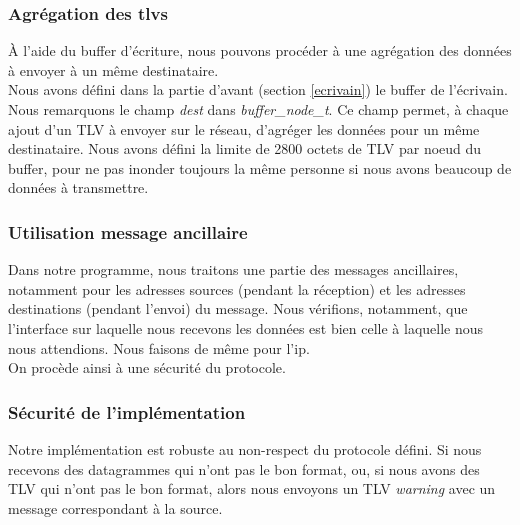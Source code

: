 \documentclass{FR16}
\begin{document}
\subsubsection{Agrégation des tlvs}
À l'aide du buffer d'écriture, nous pouvons procéder à une agrégation des données à envoyer à un même destinataire.\\
Nous avons défini dans la partie d'avant (section \ref{ecrivain}) le buffer de l'écrivain. Nous remarquons le champ \textit{dest} dans \textit{buffer\_node\_t}. Ce champ permet, à chaque ajout d'un TLV à envoyer sur le réseau, d'agréger les données pour un même destinataire. Nous avons défini la limite de 2800 octets de TLV par noeud du buffer, pour ne pas inonder toujours la même personne si nous avons beaucoup de données à transmettre.
\subsubsection{Utilisation message ancillaire}
Dans notre programme, nous traitons une partie des messages ancillaires, notamment pour les adresses sources (pendant la réception) et les adresses destinations (pendant l'envoi) du message. Nous vérifions, notamment, que l'interface sur laquelle nous recevons les données est bien celle à laquelle nous nous attendions. Nous faisons de même pour l'ip.\\
On procède ainsi à une sécurité du protocole.
\subsubsection{Sécurité de l'implémentation}
Notre implémentation est robuste au non-respect du protocole défini. Si nous recevons des datagrammes qui n'ont pas le bon format, ou, si nous avons des TLV qui n'ont pas le bon format, alors nous envoyons un TLV \textit{warning} avec un message correspondant à la source.
\end{document}
